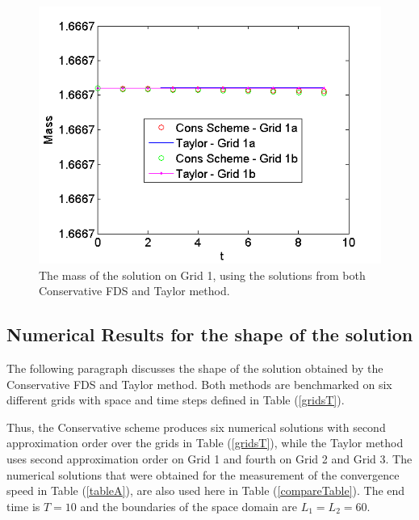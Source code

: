 \documentclass[%
 aip,
cp,  
 amsmath,amssymb,
 reprint,
]{iopconfser}
\newcommand{\rf}[1]{(\ref{#1})}
\begin{document}
\begin{figure}[ht]\vspace{0.2cm}
  \centering
  \includegraphics[width=0.5\linewidth]{mass.png}
\caption{The mass of the solution on Grid 1, using the solutions from both Conservative FDS and Taylor method.}
\label{massFig}
\end{figure}

\subsection{Numerical Results for the shape of the solution}

The following paragraph discusses the shape of the solution obtained by the Conservative FDS and Taylor method. Both methods are benchmarked on six different grids with space and time steps defined in Table \rf{gridsT}.

Thus, the Conservative scheme produces six numerical solutions with second approximation order over the grids in Table \rf{gridsT}, while the Taylor method uses second approximation order on Grid 1 and fourth on Grid 2 and Grid 3. The numerical solutions that were obtained for the measurement of the convergence speed in Table \rf{tableA}, are also used here in Table \rf{compareTable}. The end time is $T=10$ and the boundaries of the space domain are $L_1 = L_2 = 60$.
\end{document}

